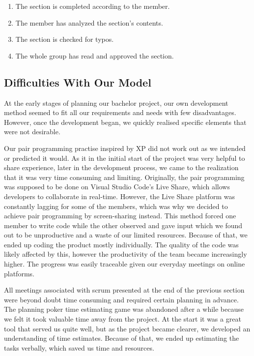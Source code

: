 \begin{enumerate}
    \item The section is completed according to the member.
    \item The member has analyzed the section's contents.
    \item The section is checked for typos.
    \item The whole group has read and approved the section.
\end{enumerate}

\subsection{Difficulties With Our Model}
At the early stages of planning our bachelor project, our own development method seemed to fit all our requirements and needs with few disadvantages. However, once the development began, we quickly realised specific elements that were not desirable. 

Our pair programming practise inspired by XP did not work out as we intended or predicted it would. As it in the initial start of the project was very helpful to share experience, later in the development process, we came to the realization that it was very time consuming and limiting. Originally, the pair programming was supposed to be done on Visual Studio Code's Live Share, which allows developers to collaborate in real-time. However, the Live Share platform was constantly lagging for some of the members, which was why we decided to achieve pair programming by screen-sharing instead. This method forced one member to write code while the other observed and gave input which we found out to be unproductive and a waste of our limited resources. Because of that, we ended up coding the product mostly individually. The quality of the code was likely affected by this, however the productivity of the team became increasingly higher. The progress was easily traceable given our everyday meetings on online platforms.   

All meetings associated with scrum presented at the end of the previous section were beyond doubt time consuming and required certain planning in advance. The planning poker time estimating game was abandoned after a while because we felt it took valuable time away from the project. At the start it was a great tool that served us quite well, but as the project became clearer, we developed an understanding of time estimates. Because of that, we ended up estimating the tasks verbally, which saved us time and resources.  

